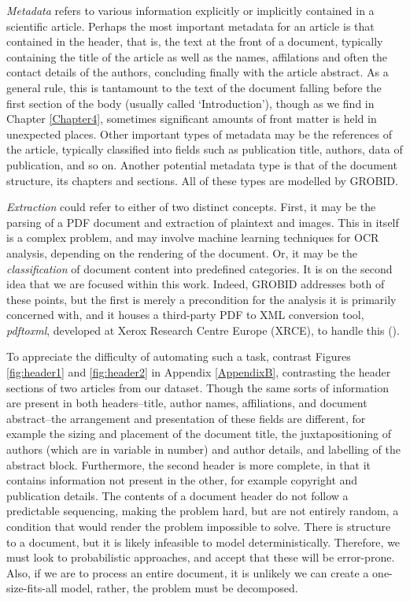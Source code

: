 \emph{Metadata} refers to various information explicitly or implicitly contained in a scientific article. Perhaps the most important metadata for an article is that contained in the header, that is, the text at the front of a document, typically containing the title of the article as well as the names, affilations and often the contact details of the authors, concluding finally with the article abstract. As a general rule, this is tantamount to the text of the document falling before the first section of the body (usually called `Introduction'), though as we find in Chapter \ref{Chapter4}, sometimes significant amounts of front matter is held in unexpected places. Other important types of metadata may be the references of the article, typically classified into fields such as publication title, authors, data of publication, and so on. Another potential metadata type is that of the document structure, its chapters and sections. All of these types are modelled by GROBID.

\emph{Extraction} could refer to either of two distinct concepts. First, it may be the parsing of a PDF document and extraction of plaintext and images. This in itself is a complex problem, and may involve machine learning techniques for OCR analysis, depending on the rendering of the document. Or, it may be the \emph{classification} of document content into predefined categories. It is on the second idea that we are focused within this work. Indeed, GROBID addresses both of these points, but the first is merely a precondition for the analysis it is primarily concerned with, and it houses a third-party PDF to XML conversion tool, \emph{pdftoxml}, developed at Xerox Research Centre Europe (XRCE), to handle this (\cite{dejean2006system}).

To appreciate the difficulty of automating such a task, contrast Figures \ref{fig:header1} and \ref{fig:header2} in Appendix \ref{AppendixB}, contrasting the header sections of two articles from our dataset. Though the same sorts of information are present in both headers--title, author names, affiliations, and document abstract--the arrangement and presentation of these fields are different, for example the sizing and placement of the document title, the juxtapositioning of authors (which are in variable in number) and author details, and labelling of the abstract block. Furthermore, the second header is more complete, in that it contains information not present in the other, for example copyright and publication details. The contents of a document header do not follow a predictable sequencing, making the problem hard, but are not entirely random, a condition that would render the problem impossible to solve. There is structure to a document, but it is likely infeasible to model deterministically. Therefore, we must look to probabilistic approaches, and accept that these will be error-prone. Also, if we are to process an entire document, it is unlikely we can create a one-size-fits-all model, rather, the problem must be decomposed.

